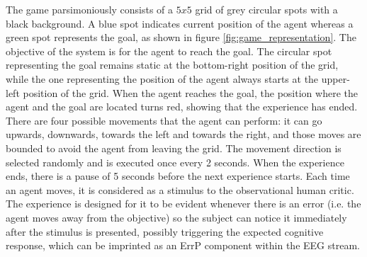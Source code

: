 \documentclass[journal]{IEEEtran}
\begin{document}
\label{cognitive_experiment_system}{
The game parsimoniously consists of a $5x5$ grid of grey circular spots with a black background.  A blue spot indicates current position of the agent whereas a green spot represents the goal, as shown in figure  \ref{fig:game_representation}. The objective of the system is for the agent to reach the goal. The circular spot representing the goal remains static at the bottom-right position of the grid, while the one representing the position of the agent always starts at the upper-left position of the grid.  When the agent reaches the goal, the position where the agent and the goal are located turns red, showing that the experience has ended. There are four possible movements that the agent can perform: it can go upwards, downwards, towards the left and towards the right, and those moves are bounded to avoid the agent from leaving the grid. The movement direction is selected randomly and is executed once every 2 seconds.  When the experience ends, there is a pause of 5 seconds before the next experience starts. Each time an agent moves, it is considered as a stimulus to the observational human critic.  The experience is designed for it to be evident whenever there is an error (i.e. the agent moves away from the objective) so the subject can notice it immediately after the stimulus is presented, possibly triggering the expected cognitive response, which can be imprinted as an ErrP component within the EEG stream.

}
\end{document}
